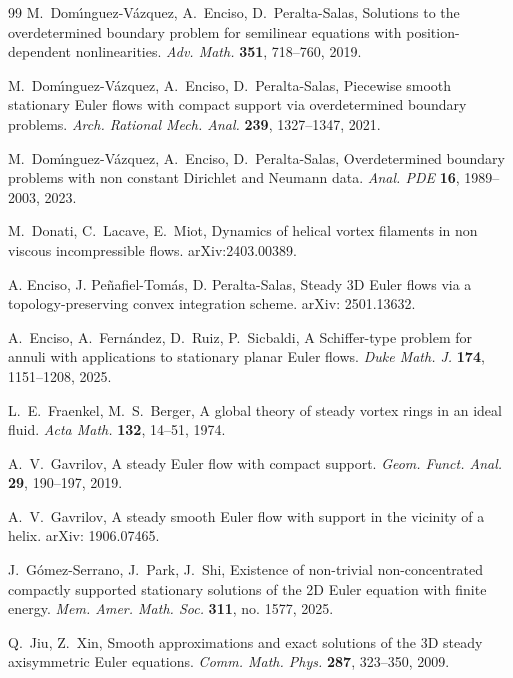 \documentclass[12pt,reqno]{amsart}
\numberwithin{equation}{section}
\theoremstyle{definition}
\theoremstyle{remark}
\begin{document}
\begin{thebibliography}{99}
M.\ Dom\'{\i}nguez-V\'azquez, A.\ Enciso, D.\ Peralta-Salas, Solutions to the overdetermined boundary problem for semilinear equations with position-dependent nonlinearities.
\textit{Adv. Math.} \textbf{351}, 718--760, 2019.

M.\ Dom\'{\i}nguez-V\'azquez, A.\ Enciso, D.\ Peralta-Salas, Piecewise smooth stationary Euler flows with compact support via overdetermined boundary problems.
\textit{Arch. Rational Mech. Anal.} \textbf{239}, 1327--1347, 2021.

M.\ Dom\'{\i}nguez-V\'azquez, A.\ Enciso, D.\ Peralta-Salas, Overdetermined boundary
problems with non constant Dirichlet and Neumann data. \textit{Anal. PDE} \textbf{16},
1989–2003,  2023. 

M.\ Donati, C.\ Lacave, E.\ Miot, Dynamics of helical vortex filaments in non viscous incompressible flows.  arXiv:2403.00389.


A. Enciso, J. Peñafiel-Tom\'as, D. Peralta-Salas, Steady 3D Euler flows via a topology-preserving convex integration scheme. arXiv: 2501.13632.

A.\ Enciso, A.\ Fern\'andez, D.\ Ruiz, P.\ Sicbaldi, A Schiffer-type problem for annuli with applications to stationary planar Euler flows. \textit{Duke Math. J.} \textbf{174}, 1151--1208, 2025.


L.\ E.\ Fraenkel, M.\ S.\ Berger, A global theory of steady vortex rings in an ideal fluid.
\textit{Acta Math.} \textbf{132}, 14--51, 1974.

A.\ V.\ Gavrilov, A steady Euler flow with compact support.
\textit{Geom. Funct. Anal.} \textbf{29}, 190--197, 2019.

A.\ V.\ Gavrilov, A steady smooth Euler flow with support in the vicinity of a helix.
 arXiv: 1906.07465.

J.\ G\'omez-Serrano, J.\ Park,  J.\ Shi,  
Existence of non-trivial non-concentrated compactly supported stationary solutions of the 2D Euler equation with finite energy.  \textit{Mem. Amer. Math. Soc.} \textbf{311}, no. 1577, 2025.

Q.\ Jiu, Z.\ Xin, Smooth approximations and exact solutions of the 3D steady axisymmetric Euler equations.
\textit{Comm. Math. Phys.} \textbf{287}, 323--350, 2009.


\end{thebibliography}
\end{document}

